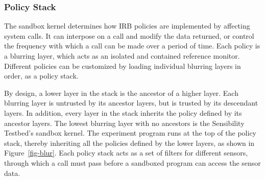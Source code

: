 \subsubsection{Policy Stack}
The sandbox kernel determines how IRB policies are implemented by affecting system calls. It can
interpose on a call and modify the data returned, or control the frequency with which a call can be made over
a period of time. 
%
Each policy is a blurring layer, which acts as an isolated and 
contained reference monitor. Different policies can be customized 
by loading individual blurring layers in order, as a policy stack. 

By design, a lower layer in the stack is the ancestor of 
a higher layer. Each blurring layer is untrusted by its ancestor layers, 
but is trusted by its descendant layers. In addition, every layer in the stack inherits the policy 
defined by its ancestor layers. The lowest blurring layer with no ancestors is the 
Sensibility Testbed's sandbox kernel. The experiment program runs at the top 
of the policy stack, thereby inheriting all the policies defined by the
lower layers, as shown in Figure~\ref{fig-blur}. 
Each policy stack acts as a set of filters for different sensors, through 
which a call must pass before a sandboxed program can
access the sensor data. 


